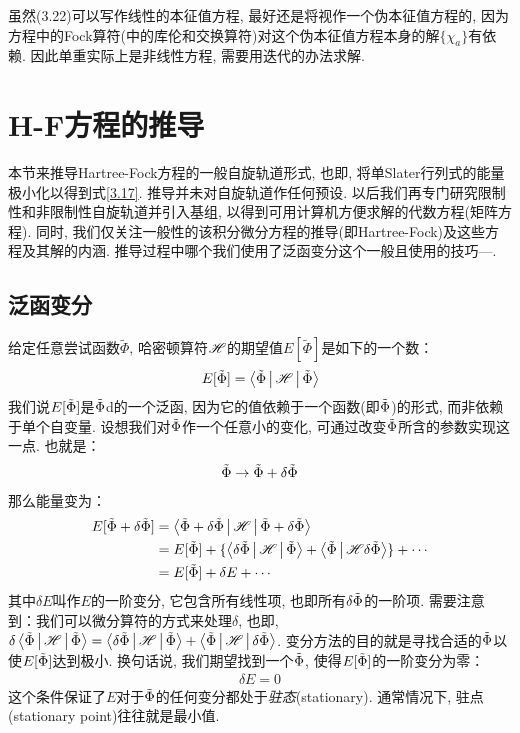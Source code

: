 虽然(3.22)可以写作线性的本征值方程, 最好还是将视作一个伪本征值方程的, 因为方程中的Fock算符(中的库伦和交换算符)对这个伪本征值方程本身的解$\{\chi_a \}$有依赖. 因此\hft 单重实际上是非线性方程, 需要用迭代的办法求解. 
\section{H-F方程的推导}
本节来推导Hartree-Fock方程的一般自旋轨道形式, 也即, 将单Slater行列式的能量极小化以得到式\eqref{3.17}. 推导并未对自旋轨道作任何预设. 以后我们再专门研究限制性和非限制性自旋轨道并引入基组, 以得到可用计算机方便求解的代数方程(矩阵方程). 同时, 我们仅关注一般性的该积分微分方程的推导(即Hartree-Fock)及这些方程及其解的内涵. 推导过程中哪个我们使用了泛函变分这个一般且使用的技巧—.  
\subsection{泛函变分}
给定任意尝试函数$\tilde{\Phi}$, 哈密顿算符$\mathscr{H}$的期望值$E[\tilde{\Phi}]$是如下的一个数：
\begin{align}
E[\tilde{\Phi}] = \Braket{\tilde{\Phi}|\mathscr{H}|\tilde{\Phi}}
\end{align}
我们说$E[\tilde{\Phi}]$是$\tilde{\Phi}$d的一个泛函, 因为它的值依赖于一个函数(即$\tilde{\Phi}$)的形式, 而非依赖于单个自变量. 设想我们对$\tilde{\Phi}$作一个任意小的变化, 可通过改变$\tilde{\Phi}$所含的参数实现这一点. 也就是：
\begin{align}
\tilde{\Phi} \to \tilde{\Phi} + \delta\tilde{\Phi}
\end{align} 
那么能量变为：
\begin{align}
E[\tilde{\Phi}+\delta\tilde{\Phi}] & = \Braket{\tilde{\Phi}+\delta\tilde{\Phi}|\mathscr{H}|\tilde{\Phi}+\delta\tilde{\Phi}} \notag\\
                 & = E[\tilde{\Phi}] + \{ \Braket{\delta\tilde{\Phi}|\mathscr{H}|\tilde{\Phi}} + \Braket{\tilde{\Phi}|\mathscr{H}\delta\tilde{\Phi}} \} + \cdots \notag\\
                 & = E[\tilde{\Phi}] + \delta E + \cdots
\end{align}
其中$\delta E$叫作$E$的一阶变分, 它包含所有线性项, 也即所有$\delta\tilde{\Phi}$的一阶项. 需要注意到：我们可以微分算符的方式来处理$\delta$, 也即, $\delta\Braket{\tilde{\Phi}|\mathscr{H}|\tilde{\Phi}} = \Braket{\delta\tilde{\Phi}|\mathscr{H}|\tilde{\Phi}} + \Braket{\tilde{\Phi}|\mathscr{H}|\delta\tilde{\Phi}}$. 变分方法的目的就是寻找合适的$\tilde{\Phi}$以使$E[\tilde{\Phi}]$达到极小. 换句话说, 我们期望找到一个$\tilde{\Phi}$, 使得$E[\tilde{\Phi}]$的一阶变分为零：
\begin{align}
\delta E = 0
\end{align}
这个条件保证了$E$对于$\tilde{\Phi}$的任何变分都处于\emph{驻态}(stationary). 通常情况下, 驻点(stationary point)往往就是最小值.

